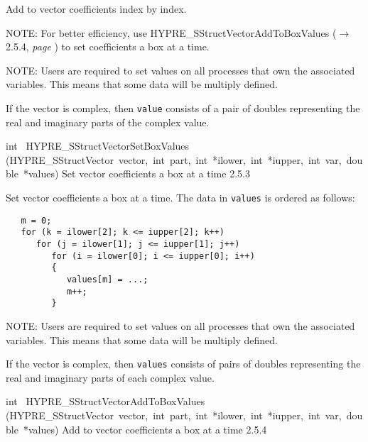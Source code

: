 \documentclass{article}
\begin{document}
\begin{cxxentry}
\begin{cxxentry}
\begin{cxxfunction}
\begin{cxxdoc}
Add to vector coefficients index by index.

NOTE: For better efficiency, use HYPRE\_SStructVectorAddToBoxValues ($\rightarrow$2.5.4, {\em page \pageref{cxx.2.5.4}}) to
set coefficients a box at a time.

NOTE: Users are required to set values on all processes that own the
associated variables.  This means that some data will be multiply defined.

If the vector is complex, then {\tt value} consists of a pair of doubles
representing the real and imaginary parts of the complex value.


\end{cxxdoc}
\end{cxxfunction}
\begin{cxxfunction}
{int\ }
        {HYPRE\_SStructVectorSetBoxValues}
        {(HYPRE\_SStructVector\ vector,\ int\ part,\ int\ *ilower,\ int\ *iupper,\ int\ var,\ double\ *values)}
        {
Set vector coefficients a box at a time}
        {2.5.3}
\begin{cxxdoc}

Set vector coefficients a box at a time.  The data in {\tt values} is ordered
as follows:

\begin{verbatim}
   m = 0;
   for (k = ilower[2]; k <= iupper[2]; k++)
      for (j = ilower[1]; j <= iupper[1]; j++)
         for (i = ilower[0]; i <= iupper[0]; i++)
         {
            values[m] = ...;
            m++;
         }
   \end{verbatim}

NOTE: Users are required to set values on all processes that own the
associated variables.  This means that some data will be multiply defined.

If the vector is complex, then {\tt values} consists of pairs of doubles
representing the real and imaginary parts of each complex value.


\end{cxxdoc}
\end{cxxfunction}
\begin{cxxfunction}
{int\ }
        {HYPRE\_SStructVectorAddToBoxValues}
        {(HYPRE\_SStructVector\ vector,\ int\ part,\ int\ *ilower,\ int\ *iupper,\ int\ var,\ double\ *values)}
        {
Add to vector coefficients a box at a time}
        {2.5.4}
\begin{cxxdoc}


\end{cxxdoc}
\end{cxxfunction}
\end{cxxentry}
\end{cxxentry}
\end{document}
